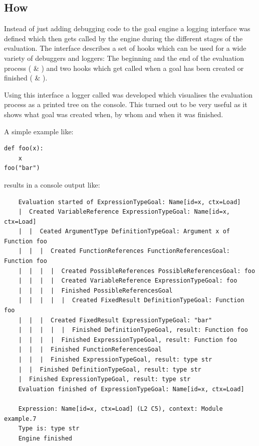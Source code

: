 \documentclass[12pt,halfparskip]{scrreprt}
\begin{document}
\subsection{How}


Instead of just adding debugging code to the goal engine a logging interface was defined which then gets called by the engine during the different stages of the evaluation. The interface  describes a set of hooks which can be used for a wide variety of debuggers and loggers: The beginning and the end of the evaluation process ( \& ) and two hooks which get called when a goal has been created or finished ( \& ).

Using this interface a logger called  was developed which visualises the evaluation process as a printed tree on the console. This turned out to be very useful as it shows what goal was created when, by whom and when it was finished. 

A simple example like:
\begin{lstlisting}
def foo(x):
    x
foo("bar")
\end{lstlisting}

results in a console output like:
\begin{verbatim}
	Evaluation started of ExpressionTypeGoal: Name[id=x, ctx=Load]
	|  Created VariableReference ExpressionTypeGoal: Name[id=x, ctx=Load]
	|  |  Ceated ArgumentType DefinitionTypeGoal: Argument x of Function foo
	|  |  |  Created FunctionReferences FunctionReferencesGoal: Function foo
	|  |  |  |  Created PossibleReferences PossibleReferencesGoal: foo
	|  |  |  |  Created VariableReference ExpressionTypeGoal: foo
	|  |  |  |  Finished PossibleReferencesGoal
	|  |  |  |  |  Created FixedResult DefinitionTypeGoal: Function foo
	|  |  |  Created FixedResult ExpressionTypeGoal: "bar"
	|  |  |  |  |  Finished DefinitionTypeGoal, result: Function foo
	|  |  |  |  Finished ExpressionTypeGoal, result: Function foo
	|  |  |  Finished FunctionReferencesGoal
	|  |  |  Finished ExpressionTypeGoal, result: type str
	|  |  Finished DefinitionTypeGoal, result: type str
	|  Finished ExpressionTypeGoal, result: type str
	Evaluation finished of ExpressionTypeGoal: Name[id=x, ctx=Load]

	Expression: Name[id=x, ctx=Load] (L2 C5), context: Module example.7
	Type is: type str
	Engine finished
\end{verbatim}
\end{document}
